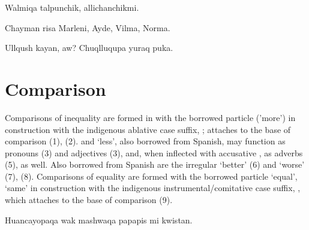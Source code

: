 %
{Walmiqa talpunchik, allichanchikmi.}%
{}%
{}{}%

%
{Chayman risa Marleni, Ayde, Vilma, Norma.}%
{}%
{}{}%

%
{Ullqush kayan, \textquestiondown{}aw? Chuqlluqupa  yuraq puka.}%
{}%
{}{}%

\section{Comparison}
Comparisons of inequality are formed in \SYQ{} with the borrowed particle  ('more') in construction with the indigenous ablative case suffix, ;  attaches to the base of comparison (1), (2).  and  `less', also borrowed from Spanish, may function as pronouns (3) and adjectives (3), and, when inflected with accusative , as adverbs (5), as well. Also borrowed from Spanish are the irregular  `better' (6) and  `worse' (7), (8). Comparisons of equality are formed with the borrowed particle  `equal', `same' in construction with the indigenous instrumental/comitative case suffix, , which attaches to the base of comparison (9).

%
{Huancayopaqa wak mashwaqa papapis mi kwistan.}%
{}%
{}{}%

